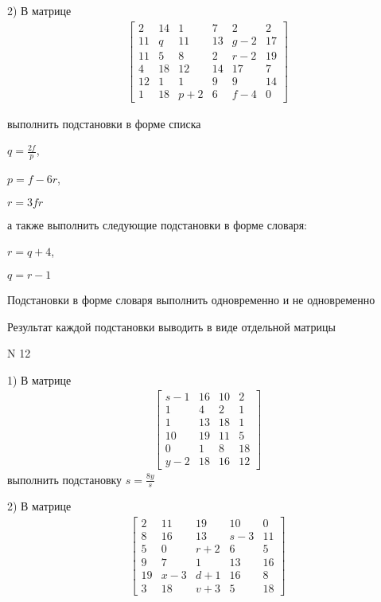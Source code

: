 \documentclass[11pt]{report}
\begin{document}
    2) В матрице
\begin{align*}
\left[\begin{matrix}2 & 14 & 1 & 7 & 2 & 2\\11 & q & 11 & 13 & g - 2 & 17\\11 & 5 & 8 & 2 & r - 2 & 19\\4 & 18 & 12 & 14 & 17 & 7\\12 & 1 & 1 & 9 & 9 & 14\\1 & 18 & p + 2 & 6 & f - 4 & 0\end{matrix}\right]
\end{align*}

выполнить подстановки в форме списка

$q=\frac{2 f}{p}$,

$p=f - 6 r$,

$r=3 f r$

а также выполнить следующие подстановки в форме словаря:

$r=q + 4$,

$q=r - 1$


    Подстановки в форме словаря выполнить одновременно и не одновременно


    Результат каждой подстановки выводить в виде отдельной матрицы

\newpage
N 12


    1) В матрице
\begin{align*}
\left[\begin{matrix}s - 1 & 16 & 10 & 2\\1 & 4 & 2 & 1\\1 & 13 & 18 & 1\\10 & 19 & 11 & 5\\0 & 1 & 8 & 18\\y - 2 & 18 & 16 & 12\end{matrix}\right]
\end{align*}
выполнить подстановку $s=\frac{8 y}{s}$


    2) В матрице
\begin{align*}
\left[\begin{matrix}2 & 11 & 19 & 10 & 0\\8 & 16 & 13 & s - 3 & 11\\5 & 0 & r + 2 & 6 & 5\\9 & 7 & 1 & 13 & 16\\19 & x - 3 & d + 1 & 16 & 8\\3 & 18 & v + 3 & 5 & 18\end{matrix}\right]
\end{align*}
\end{document}
